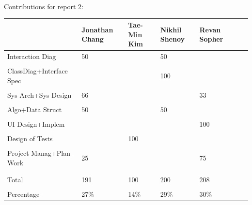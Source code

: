 \documentclass[letterpaper,english, 12pt]{scrreprt}
\begin{document}
Contributions for report 2:\\
\begin{center}
	\begin{tabular}{|l|C{2cm}|C{2cm}|C{2cm}|C{2cm}|C{2cm}|C{2cm}|}
		\hline
                        & Jonathan Chang& Tae-Min Kim   & Nikhil Shenoy & Revan Sopher  \\ \hline
Interaction Diag        &      50       &               &      50       &               \\ \hline
                        &               &               &               &               \\ \hline
ClassDiag+Interface Spec&               &               &     100       &               \\ \hline
                        &               &               &               &               \\ \hline
Sys Arch+Sys Design     &      66       &               &               &     33        \\ \hline
                        &               &               &               &               \\ \hline
Algo+Data Struct        &      50       &               &      50       &               \\ \hline
                        &               &               &               &               \\ \hline
UI Design+Implem        &               &               &               &    100        \\ \hline
                        &               &               &               &               \\ \hline
Design of Tests         &               &      100      &               &               \\ \hline
                        &               &               &               &               \\ \hline
Project Manag+Plan Work &      25       &               &               &     75        \\ \hline
                        &               &               &               &               \\ \hline

                        &               &               &               &               \\ \hline
Total                   &     191       &      100      &     200       &    208        \\ \hline
                        &               &               &               &               \\ \hline
Percentage              &      27\%     &      14\%     &      29\%     &     30\%      \\ \hline
	\end{tabular}
\end{center}
\end{document}
